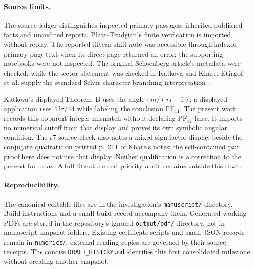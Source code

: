 \paragraph{Source limits.}
The source ledger distinguishes inspected primary passages, inherited
published facts and unaudited reports. Platt--Trudgian's finite verification
is imported without replay. The reported fifteen-shift note was accessible
through indexed primary-page text when its direct page returned an error;
the supporting notebooks were not inspected. The original Schoenberg
article's metadata were checked, while the sector statement was checked
in Katkova and Khare. Etingof et al. supply the standard Schur-character
branching interpretation~\cite{EtingofRepresentationTheory20110110}.

Katkova's displayed Theorem~B uses the angle $\pi m/(m+1)$; a displayed
application uses $43\pi/44$ while labeling the conclusion PF$_{44}$.
The present work records this apparent integer mismatch without declaring
PF$_{44}$ false. It imports no numerical cutoff from that display and
proves its own symbolic angular condition. The r7 source check also notes
a mixed-sign factor display beside the conjugate quadratic on printed
p.~211 of Khare's notes; the self-contained pair proof here does not
use that display. Neither qualification is a correction to the present
formulas. A full literature and priority
audit remains outside this draft.

\paragraph{Reproducibility.}
The canonical editable files are in the investigation's
\texttt{manuscript/} directory. Build instructions and a small build
record accompany them. Generated working PDFs are stored in the
repository's ignored \texttt{output/pdf/} directory, not in manuscript
snapshot folders. Existing certificate scripts and small JSON records
remain in \texttt{numerics/}; external reading copies are governed by
their source receipts. The concise \texttt{DRAFT\_HISTORY.md} identifies
this first consolidated milestone without creating another snapshot.
